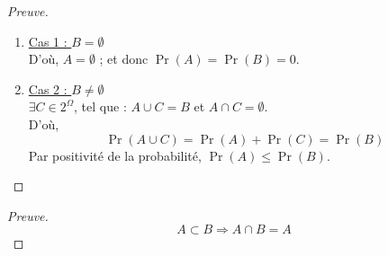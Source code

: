 \begin{proof}[Preuve]
$ $
\begin{enumerate}
\item \underline{Cas 1 : $B=\emptyset$}
\\
D'où, $A=\emptyset$ ; et donc $\Pr(A)=\Pr(B)=0$.

\item \underline{Cas 2 : $B\not=\emptyset$}
\\
$\exists C\in 2^\Omega$, tel que :
$A\cup C =B$ et $A\cap C=\emptyset$.
\\
D'où, 
$$
\Pr(A\cup C) = \Pr(A) + \Pr(C) = \Pr(B)
$$
Par positivité de la probabilité, $\Pr(A) \leq \Pr(B)$.
\end{enumerate}

\end{proof}

\begin{proof}[Preuve]
$$
A  \subset B \Rightarrow
	A\cap B = A
$$
\end{proof}

